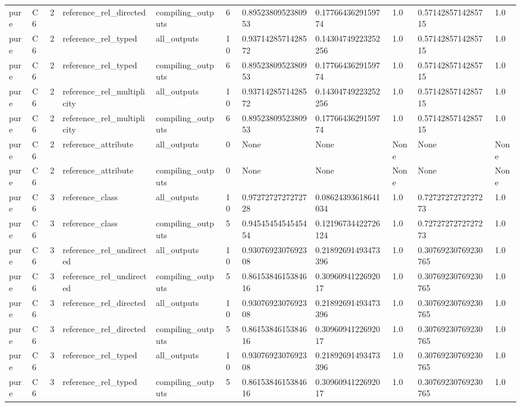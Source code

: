 \begin{tabular}{lllllllllll}
pure & C6 & 2 & reference\_rel\_directed & compiling\_outputs & 6 & 0.8952380952380953 & 0.1776643629159774 & 1.0 & 0.5714285714285715 & 1.0 \\
pure & C6 & 2 & reference\_rel\_typed & all\_outputs & 10 & 0.9371428571428572 & 0.14304749223252256 & 1.0 & 0.5714285714285715 & 1.0 \\
pure & C6 & 2 & reference\_rel\_typed & compiling\_outputs & 6 & 0.8952380952380953 & 0.1776643629159774 & 1.0 & 0.5714285714285715 & 1.0 \\
pure & C6 & 2 & reference\_rel\_multiplicity & all\_outputs & 10 & 0.9371428571428572 & 0.14304749223252256 & 1.0 & 0.5714285714285715 & 1.0 \\
pure & C6 & 2 & reference\_rel\_multiplicity & compiling\_outputs & 6 & 0.8952380952380953 & 0.1776643629159774 & 1.0 & 0.5714285714285715 & 1.0 \\
pure & C6 & 2 & reference\_attribute & all\_outputs & 0 & None & None & None & None & None \\
pure & C6 & 2 & reference\_attribute & compiling\_outputs & 0 & None & None & None & None & None \\
pure & C6 & 3 & reference\_class & all\_outputs & 10 & 0.9727272727272728 & 0.08624393618641034 & 1.0 & 0.7272727272727273 & 1.0 \\
pure & C6 & 3 & reference\_class & compiling\_outputs & 5 & 0.9454545454545454 & 0.12196734422726124 & 1.0 & 0.7272727272727273 & 1.0 \\
pure & C6 & 3 & reference\_rel\_undirected & all\_outputs & 10 & 0.9307692307692308 & 0.21892691493473396 & 1.0 & 0.30769230769230765 & 1.0 \\
pure & C6 & 3 & reference\_rel\_undirected & compiling\_outputs & 5 & 0.8615384615384616 & 0.3096094122692017 & 1.0 & 0.30769230769230765 & 1.0 \\
pure & C6 & 3 & reference\_rel\_directed & all\_outputs & 10 & 0.9307692307692308 & 0.21892691493473396 & 1.0 & 0.30769230769230765 & 1.0 \\
pure & C6 & 3 & reference\_rel\_directed & compiling\_outputs & 5 & 0.8615384615384616 & 0.3096094122692017 & 1.0 & 0.30769230769230765 & 1.0 \\
pure & C6 & 3 & reference\_rel\_typed & all\_outputs & 10 & 0.9307692307692308 & 0.21892691493473396 & 1.0 & 0.30769230769230765 & 1.0 \\
pure & C6 & 3 & reference\_rel\_typed & compiling\_outputs & 5 & 0.8615384615384616 & 0.3096094122692017 & 1.0 & 0.30769230769230765 & 1.0 \\

\end{tabular}

